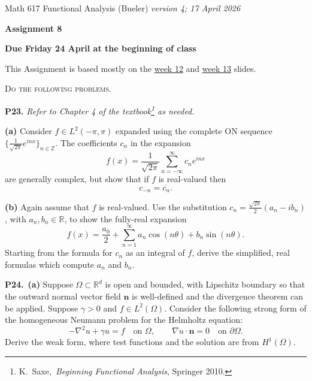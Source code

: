 \documentclass[12pt]{amsart}
\newcommand{\bn}{\mathbf{n}}
\newcommand{\RR}{\mathbb{R}}
\newcommand{\ZZ}{\mathbb{Z}}
\newcommand{\grad}{\nabla}
\newcommand{\prob}[1]{\bigskip\noindent\textbf{#1.}\quad }
\newcommand{\epart}[1]{\medskip\noindent\textbf{(#1)}\quad }
\newcommand{\ppart}[1]{\,\textbf{(#1)}\quad }
\begin{document}
\scriptsize \noindent Math 617 Functional Analysis (Bueler) \hfill \emph{{\color{red} version 4}; 17 April 2026}
\normalsize\medskip

\Large\centerline{\textbf{Assignment 8}}
\large
\medskip

\centerline{\textbf{Due Friday 24 April at the beginning of class}}
\medskip
\normalsize

\thispagestyle{empty}

\bigskip
\noindent This Assignment is based mostly on the \href{https://bueler.github.io/fa/assets/slides/S26/week12.pdf}{week 12} and \href{https://bueler.github.io/fa/assets/slides/S26/week13.pdf}{week 13} slides.

\newcommand{\augment}[1]{\quad\,\strut \begin{minipage}[t]{0.7\textwidth} \emph{#1}\end{minipage}}

\newcommand{\augpart}[1]{\emph{\textbf{(#1)}}}

\medskip
\noindent \textsc{Do the following problems.}


\prob{P23} \emph{Refer to Chapter 4 of the textbook\footnote{K.~Saxe,~\emph{Beginning Functional Analysis}, Springer 2010.} as needed.}

\epart{a} Consider $f\in L^2(-\pi,\pi)$ expanded using the complete ON sequence $\{\frac{1}{\sqrt{2\pi}} e^{inx}\}_{n\in \ZZ}$.  The coefficients $c_n$ in the expansion
	$$f(x) = \frac{1}{\sqrt{2\pi}} \sum_{n=-\infty}^\infty c_n e^{inx}$$
are generally complex, but show that if $f$ is real-valued then
	$$c_{-n} = \overline{c_n}.$$

\epart{b} Again assume that $f$ is real-valued.  Use the substitution $c_n = \frac{\sqrt{2\pi}}{2} (a_n-i b_n)$, with $a_n,b_n\in\RR$, to show the fully-real expansion
    $$f(x) = \frac{a_0}{2} + \sum_{n=1}^\infty a_n \cos(n\theta) + b_n \sin(n\theta).$$
Starting from the formula for $c_n$ as an integral of $f$, derive the simplified, real formulas which compute $a_n$ and $b_n$.

\prob{P24}  \ppart{a} Suppose $\Omega\subset \RR^d$ is open and bounded, with Lipschitz boundary so that the outward normal vector field $\bn$ is well-defined and the divergence theorem can be applied.  Suppose $\gamma>0$ and $f\in L^2(\Omega)$.  Consider the following strong form of the homogeneous Neumann problem for the Helmholtz equation:
	$$-\grad^2 u + \gamma u = f \quad \text{on } \Omega, \qquad \grad u\cdot \bn = 0 \quad \text{on } \partial \Omega.$$
Derive the weak form, where test functions and the solution are from $H^1(\Omega)$.
\end{document}
